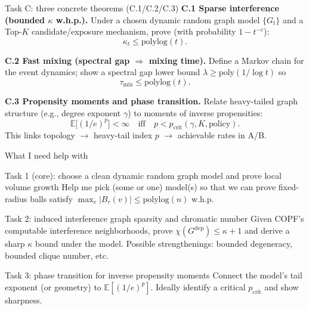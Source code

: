 \documentclass[aspectratio=169,11pt]{beamer}
\newcommand{\1}{\mathbbm{1}}
\newcommand{\E}{\mathbb{E}}
\newcommand{\polylog}{\mathrm{polylog}}
\begin{document}
\begin{frame}{Task C: three concrete theorems (C.1/C.2/C.3)}
\small
\textbf{C.1 Sparse interference (bounded $\kappa$ w.h.p.).}
Under a chosen dynamic random graph model $\{G_t\}$ and a Top-$K$ candidate/exposure mechanism,
prove (with probability $1-t^{-c}$):
\[
\kappa_t \le \mathrm{polylog}(t).
\]

\vspace{0.5em}
\textbf{C.2 Fast mixing (spectral gap $\Rightarrow$ mixing time).}
Define a Markov chain for the event dynamics; show a spectral gap lower bound
\(\lambda\ge \mathrm{poly}(1/\log t)\) so
\[
\tau_{\mathrm{mix}} \le \mathrm{polylog}(t).
\]

\vspace{0.5em}
\textbf{C.3 Propensity moments and phase transition.}
Relate heavy-tailed graph structure (e.g., degree exponent $\gamma$) to moments of inverse propensities:
\[
\E\Big[(1/e)^p\Big] < \infty \quad\text{iff}\quad p < p_{\mathrm{crit}}(\gamma,K,\text{policy}).
\]
This links topology $\to$ heavy-tail index $p$ $\to$ achievable rates in A/B.
\end{frame}

\begin{frame}{What I need help with}

\begin{block}{Task 1 (core): choose a clean dynamic random graph model and prove local volume growth}
\small
Help me pick (some or one) model(s) so that we can prove
fixed-radius balls satisfy $\max_v |B_r(v)| \le \polylog(n)$ w.h.p.
\end{block}

\begin{block}{Task 2: induced interference graph sparsity and chromatic number}
\small
Given COPF's computable interference neighborhoods, prove
$\chi(G^{\mathrm{dep}})\le \kappa+1$ and derive a sharp $\kappa$ bound under the model.
Possible strengthenings: bounded degeneracy, bounded clique number, etc.
\end{block}

\begin{block}{Task 3: phase transition for inverse propensity moments}
\small
Connect the model's tail exponent (or geometry) to $\E[(1/e)^p]$.
Ideally identify a critical $p_{\mathrm{crit}}$ and show sharpness.
\end{block}
\end{frame}
\end{document}
